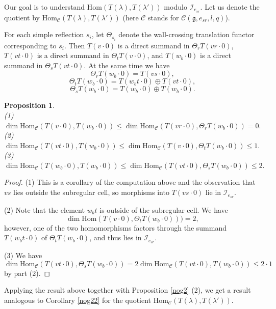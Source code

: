 \documentclass{amsart}
\newtheorem{proposition}[theorem]{Proposition}
\theoremstyle{definition}
\newcommand{\C}{\mathcal{C}}
\newcommand{\Hom}{\mathrm{Hom}}
\numberwithin{equation}{section}
\begin{document}
Our goal is to understand $\Hom(T(\lambda), T(\lambda'))$ modulo $\mathcal I_{e_{sr}}$. Let us denote the quotient by $\Hom_\C(T(\lambda), T(\lambda'))$ (here $\C$ stands for $\C(\mathfrak g, e_{sr}, l,q)$).

For each simple reflection $s_i$, let $\varTheta_{s_i}$ denote the wall-crossing translation functor corresponding to $s_i$. Then $T(v\cdot 0)$ is a direct summand in $\varTheta_r T(vr\cdot 0)$, $T(vt \cdot 0)$ is a direct summand in $\varTheta_t T(v\cdot 0)$, and $T(w_b\cdot 0)$ is a direct summand in $\varTheta_s T(vt\cdot 0)$. At the same time we have
$$
\varTheta_r T(w_b\cdot 0)=T(vs\cdot 0),
$$
$$
\varTheta_t T(w_b\cdot 0) = T(w_bt\cdot 0)\oplus T(vt\cdot 0),
$$
$$
\varTheta_s T(w_b\cdot 0)= T(w_b\cdot 0)\oplus T(w_b\cdot 0).
$$



\begin{proposition} \label{prop:bad weight homs} $ $\\ \vspace{2mm}
 (1) $\dim \Hom_\C(T(v\cdot 0), T(w_b\cdot 0))\le \dim \Hom_\C(T(vr\cdot 0), \varTheta_r T(w_b\cdot 0))=0.$
\\
\vspace{2mm}(2)  $\dim \Hom_\C(T(vt\cdot 0), T(w_b\cdot 0)) \le \dim\Hom_\C(T(v\cdot 0), \varTheta_t T(w_b\cdot 0)) \le 1.$\\
(3) $\dim \Hom_\C(T(w_b\cdot 0), T(w_b\cdot 0)) \le \dim\Hom_\C(T(vt\cdot 0), \varTheta_s T(w_b\cdot 0))\le 2.$

\end{proposition}
\begin{proof}
(1) This is a corollary of the computation above and the observation that $vs$ lies outside the subregular cell, so morphisms into $T(vs\cdot 0)$ lie in $\mathcal I_{e_{sr}}$.

(2) Note that the element $w_bt$ is outside of the subregular cell. We have $$\dim\Hom(T(v\cdot 0), \varTheta_t T(w_b\cdot 0)))=2,$$ however, one of the two homomorphisms factors through the summand $T(w_bt\cdot 0)$ of $\varTheta_t T(w_b\cdot 0)$, and thus lies in $\mathcal I_{e_{sr}}$.

(3) We have 
$$
\dim\Hom_\C(T(vt\cdot 0), \varTheta_sT(w_b\cdot 0))=2\dim\Hom_\C(T(vt\cdot 0), T(w_b\cdot 0))\le 2\cdot 1
$$
by part (2).
\end{proof}

Applying the result above together with Proposition \ref{nog2} (2), we get a result analogous to Corollary \ref{nog22} for the quotient $\Hom_\C(T(\lambda), T(\lambda'))$.
\end{document}
